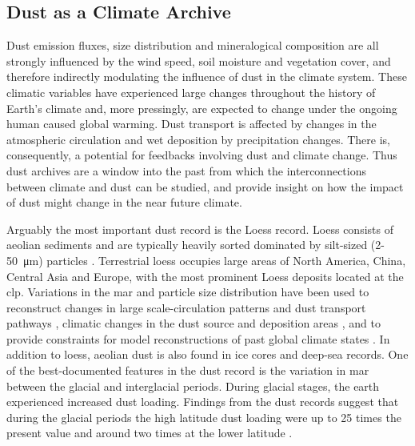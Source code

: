 \subsection{Dust as a Climate Archive}
Dust emission fluxes, size distribution and mineralogical composition are all strongly influenced by the wind speed, soil moisture and vegetation cover, and therefore indirectly modulating the influence of dust in the climate system. 
These climatic variables have experienced large changes throughout the history of Earth's climate and, more pressingly, are expected to change under the ongoing human caused global warming. Dust transport is affected by changes in the atmospheric circulation and wet deposition by precipitation changes. 
There is, consequently, a potential for feedbacks involving dust and climate change.
Thus dust archives are a window into the past from which the interconnections between climate and dust can be studied, and provide insight on how the impact of dust might change in the near future climate. 

Arguably the most important dust record is the Loess record. Loess consists of aeolian sediments and are typically heavily sorted dominated by silt-sized (2-\SI{50}{\micro\metre}) particles \parencite{muhs2014loess}. Terrestrial loess occupies large areas of North America, China, Central Asia and Europe, with the most prominent Loess deposits located at the \acrfull{clp}.
Variations in the \acrfull{mar} and particle size distribution have been used to reconstruct changes in large scale-circulation patterns and dust transport pathways \parencite{maher2016palaeoclimatic,ding2000re}, climatic changes in the dust source and deposition areas \parencite{shang2016variations,sun2005late}, and to provide constraints for model reconstructions of past global climate states \parencite{da2015early}. 
In addition to loess, aeolian dust is also found in ice cores and deep-sea records. One of the best-documented features in the dust record is the variation in \acrfull{mar} between the glacial and interglacial periods. 
During glacial stages, the earth experienced increased dust loading. Findings from the dust records suggest that during the glacial periods the high latitude dust loading were up to 25 times the present value and around two times at the lower latitude \parencite{shao2011dust}.     


